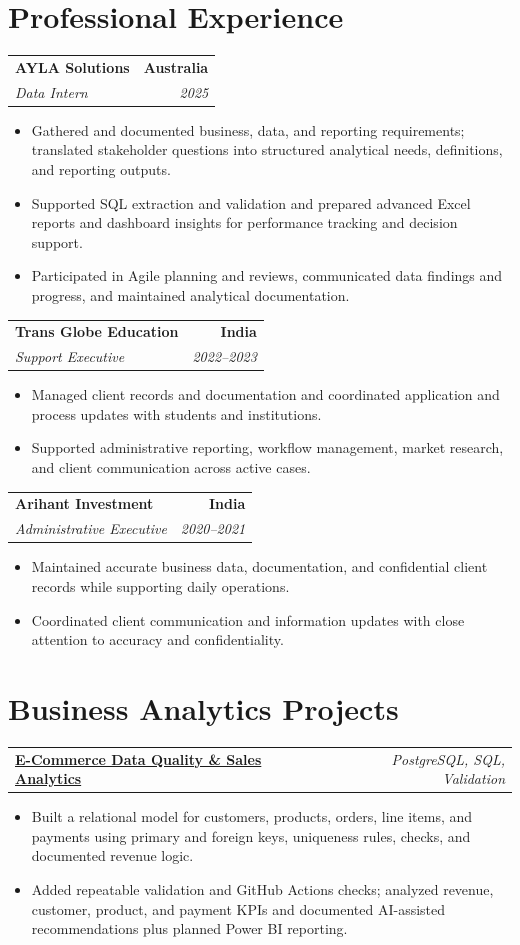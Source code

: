 \documentclass[letterpaper,10pt]{article}
\makeatletter
\newcommand{\role}[4]{%
  \begin{tabularx}{\textwidth}{@{}Xr@{}}
    \textbf{#1} & \textbf{#2} \\
    \textit{#3} & \textit{#4}
  \end{tabularx}\vspace{-1pt}
}
\newcommand{\project}[2]{%
  \begin{tabularx}{\textwidth}{@{}Xr@{}}
    \textbf{#1} & \textit{#2}
  \end{tabularx}\vspace{-1pt}
}
\makeatother
\begin{document}
\section{Professional Experience}
\role{AYLA Solutions}{Australia}{Data Intern}{2025}
\begin{itemize}
  \item Gathered and documented business, data, and reporting requirements; translated stakeholder questions into structured analytical needs, definitions, and reporting outputs.
  \item Supported SQL extraction and validation and prepared advanced Excel reports and dashboard insights for performance tracking and decision support.
  \item Participated in Agile planning and reviews, communicated data findings and progress, and maintained analytical documentation.
\end{itemize}
\vspace{1pt}

\role{Trans Globe Education}{India}{Support Executive}{2022--2023}
\begin{itemize}
  \item Managed client records and documentation and coordinated application and process updates with students and institutions.
  \item Supported administrative reporting, workflow management, market research, and client communication across active cases.
\end{itemize}
\vspace{1pt}

\role{Arihant Investment}{India}{Administrative Executive}{2020--2021}
\begin{itemize}
  \item Maintained accurate business data, documentation, and confidential client records while supporting daily operations.
  \item Coordinated client communication and information updates with close attention to accuracy and confidentiality.
\end{itemize}

\section{Business Analytics Projects}
\project{\href{https://github.com/jainalimehta/Ecommerce-Sales-Analytics}{E-Commerce Data Quality \& Sales Analytics}}{PostgreSQL, SQL, Validation}
\begin{itemize}
  \item Built a relational model for customers, products, orders, line items, and payments using primary and foreign keys, uniqueness rules, checks, and documented revenue logic.
  \item Added repeatable validation and GitHub Actions checks; analyzed revenue, customer, product, and payment KPIs and documented AI-assisted recommendations plus planned Power BI reporting.
\end{itemize}
\vspace{1pt}
\end{document}
